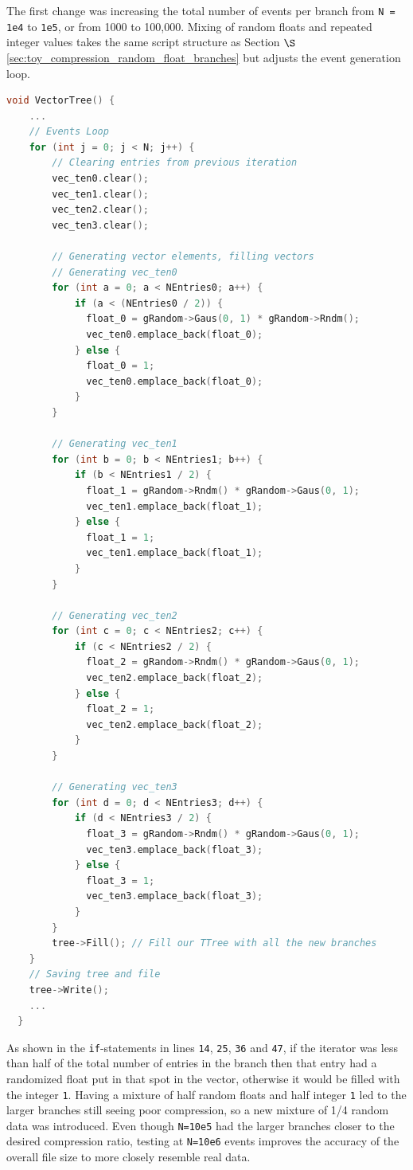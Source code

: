 The first change was increasing the total number of events per branch from \verb|N = 1e4| to \verb|1e5|, or from 1000 to 100,000. 
Mixing of random floats and repeated integer values takes the same script structure as Section $\S$ \ref{sec:toy_compression_random_float_branches} but adjusts the event generation loop.
\begin{lstlisting}[language=C]  
  void VectorTree() {
    ...
    // Events Loop
    for (int j = 0; j < N; j++) {
        // Clearing entries from previous iteration
        vec_ten0.clear();
        vec_ten1.clear();
        vec_ten2.clear();
        vec_ten3.clear();

        // Generating vector elements, filling vectors
        // Generating vec_ten0
        for (int a = 0; a < NEntries0; a++) {
            if (a < (NEntries0 / 2)) {
              float_0 = gRandom->Gaus(0, 1) * gRandom->Rndm();
              vec_ten0.emplace_back(float_0);
            } else {
              float_0 = 1; 
              vec_ten0.emplace_back(float_0);
            }
        }

        // Generating vec_ten1
        for (int b = 0; b < NEntries1; b++) {
            if (b < NEntries1 / 2) {
              float_1 = gRandom->Rndm() * gRandom->Gaus(0, 1);
              vec_ten1.emplace_back(float_1);
            } else {
              float_1 = 1;
              vec_ten1.emplace_back(float_1);
            }
        }

        // Generating vec_ten2
        for (int c = 0; c < NEntries2; c++) {
            if (c < NEntries2 / 2) {
              float_2 = gRandom->Rndm() * gRandom->Gaus(0, 1);
              vec_ten2.emplace_back(float_2);
            } else {
              float_2 = 1;
              vec_ten2.emplace_back(float_2);
            }
        }

        // Generating vec_ten3
        for (int d = 0; d < NEntries3; d++) {
            if (d < NEntries3 / 2) {
              float_3 = gRandom->Rndm() * gRandom->Gaus(0, 1);
              vec_ten3.emplace_back(float_3);
            } else {
              float_3 = 1;
              vec_ten3.emplace_back(float_3);
            }
        }
        tree->Fill(); // Fill our TTree with all the new branches
    }
    // Saving tree and file
    tree->Write();
    ...
  }
\end{lstlisting}

As shown in the \verb|if|-statements in lines \verb|14|, \verb|25|, \verb|36| and \verb|47|, if the iterator was less than half of the total number of entries in the branch then that entry had a randomized float put in that spot in the vector, otherwise it would be filled with the integer \verb|1|.
Having a mixture of half random floats and half integer \verb|1| led to the larger branches still seeing poor compression, so a new mixture of 1/4 random data was introduced. 
Even though \verb|N=10e5| had the larger branches closer to the desired compression ratio, testing at \verb|N=10e6| events improves the accuracy of the overall file size to more closely resemble real data.


